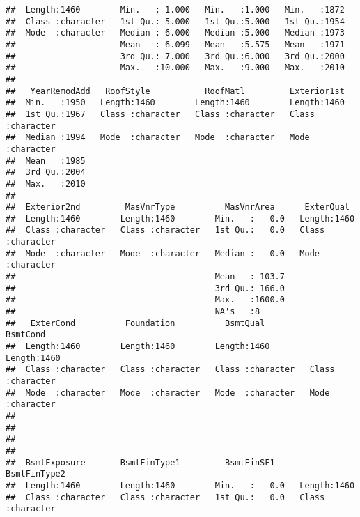 \documentclass[
]{article}
\begin{document}
\begin{verbatim}
##  Length:1460        Min.   : 1.000   Min.   :1.000   Min.   :1872  
##  Class :character   1st Qu.: 5.000   1st Qu.:5.000   1st Qu.:1954  
##  Mode  :character   Median : 6.000   Median :5.000   Median :1973  
##                     Mean   : 6.099   Mean   :5.575   Mean   :1971  
##                     3rd Qu.: 7.000   3rd Qu.:6.000   3rd Qu.:2000  
##                     Max.   :10.000   Max.   :9.000   Max.   :2010  
##                                                                    
##   YearRemodAdd   RoofStyle           RoofMatl         Exterior1st       
##  Min.   :1950   Length:1460        Length:1460        Length:1460       
##  1st Qu.:1967   Class :character   Class :character   Class :character  
##  Median :1994   Mode  :character   Mode  :character   Mode  :character  
##  Mean   :1985                                                           
##  3rd Qu.:2004                                                           
##  Max.   :2010                                                           
##                                                                         
##  Exterior2nd         MasVnrType          MasVnrArea      ExterQual        
##  Length:1460        Length:1460        Min.   :   0.0   Length:1460       
##  Class :character   Class :character   1st Qu.:   0.0   Class :character  
##  Mode  :character   Mode  :character   Median :   0.0   Mode  :character  
##                                        Mean   : 103.7                     
##                                        3rd Qu.: 166.0                     
##                                        Max.   :1600.0                     
##                                        NA's   :8                          
##   ExterCond          Foundation          BsmtQual           BsmtCond        
##  Length:1460        Length:1460        Length:1460        Length:1460       
##  Class :character   Class :character   Class :character   Class :character  
##  Mode  :character   Mode  :character   Mode  :character   Mode  :character  
##                                                                             
##                                                                             
##                                                                             
##                                                                             
##  BsmtExposure       BsmtFinType1         BsmtFinSF1     BsmtFinType2      
##  Length:1460        Length:1460        Min.   :   0.0   Length:1460       
##  Class :character   Class :character   1st Qu.:   0.0   Class :character  

\end{verbatim}
\end{document}
